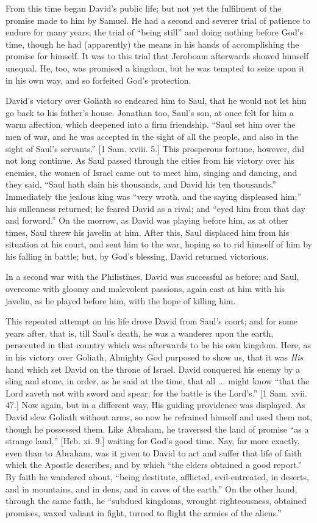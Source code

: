 From this time began David's public life; but not yet the
fulfilment of the promise made to him by Samuel. He had a second and
severer trial of patience to endure for many years; the trial of
``being still'' and doing nothing before God's time, though he
had (apparently) the means in his hands of accomplishing the promise
for himself. It was to this trial that Jeroboam afterwards showed
himself unequal. He, too, was promised a kingdom, but he was tempted
to seize upon it in his own way, and so forfeited God's protection.

David's victory over Goliath so endeared him to Saul, that he would
not let him go back to his father's house. Jonathan too, Saul's son,
at once felt for him a warm affection, which deepened into a firm
friendship. ``Saul set him over the men of war, and he was
accepted in the sight of all the people, and also in the sight of Saul's
servants.'' [1 Sam. xviii. 5.] This prosperous fortune, however,
did not long continue. As Saul passed through the cities from his
victory over his enemies, the women of Israel came out to meet him,
singing and dancing, and they said, ``Saul hath slain his
thousands, and David his ten thousands.'' Immediately the jealous
king was ``very wroth, and the saying displeased him;'' his
sullenness returned; he feared David as a rival; and ``eyed him
from that day and forward.'' On the morrow, as David was playing
before him, as at other times, Saul threw his javelin at him. After
this, Saul displaced him from his situation at his court, and sent him
to the war, hoping so to rid himself of him by his falling in battle;
but, by God's blessing, David returned victorious.

In a second war with the Philistines, David was successful as
before; and Saul, overcome with gloomy and malevolent passions, again
cast at him with his javelin, as he played before him, with the hope
of killing him.

This repeated attempt on his life drove David from Saul's court;
and for some years after, that is, till Saul's death, he was a
wanderer upon the earth, persecuted in that country which was
afterwards to be his own kingdom. Here, as in his victory over
Goliath, Almighty God purposed to show us, that it was \emph{His} hand
which set David on the throne of Israel. David conquered his enemy by
a sling and stone, in order, as he said at the time, that all ...
might know ``that the Lord saveth not with sword and spear; for
the battle is the Lord's.'' [1 Sam. xvii. 47.] Now again, but in a
different way, His guiding providence was displayed. As David slew
Goliath without arms, so now he refrained himself and used them not,
though he possessed them. Like Abraham, he traversed the land of
promise ``as a strange land,'' [Heb. xi. 9.] waiting for God's
good time. Nay, far more exactly, even than to Abraham, was it given
to David to act and suffer that life of faith which the Apostle
describes, and by which ``the elders obtained a good report.''
By faith he wandered about, ``being destitute, afflicted,
evil-entreated, in deserts, and in mountains, and in dens, and in
caves of the earth.'' On the other hand, through the same faith,
he ``subdued kingdoms, wrought righteousness, obtained promises,
waxed valiant in fight, turned to flight the armies of the
aliens.''

